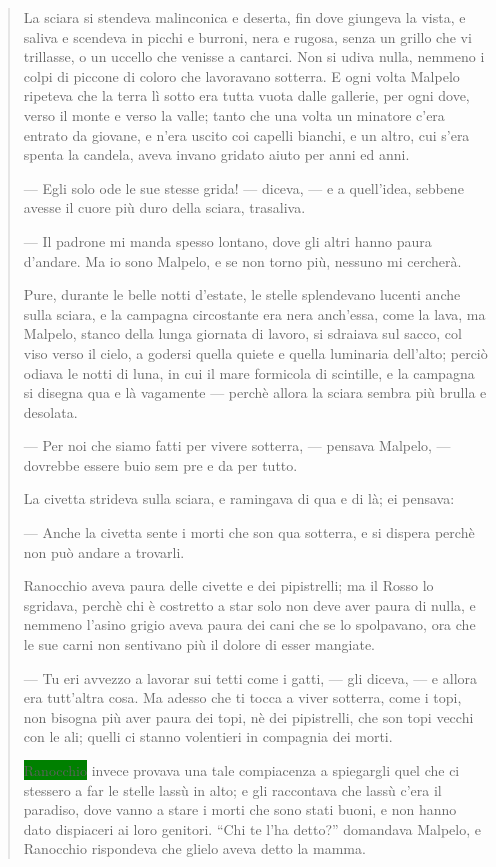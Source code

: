 \documentclass{book}
\newcounter{mar}
\begin{document}
\begin{quote}
 La sciara si stendeva malinconica e deserta, fin dove giungeva la vista, e saliva e scendeva in picchi e burroni, nera e rugosa, senza un grillo che vi trillasse, o un uccello che venisse a cantarci. Non si udiva nulla, nemmeno i colpi di piccone di coloro che lavoravano sotterra. E ogni volta Malpelo ripeteva che la terra lì sotto era tutta vuota dalle gallerie, per ogni dove, verso il monte e verso la valle; tanto che una volta un minatore c’era entrato da giovane, e n’era uscito coi capelli bianchi, e un altro, cui s’era spenta la candela, aveva invano gridato aiuto per anni ed anni.
 
 — Egli solo ode le sue stesse grida! — diceva, — e a quell’idea, sebbene avesse il cuore più duro della sciara, trasaliva.
 
 — Il padrone mi manda spesso lontano, dove gli altri hanno paura d’andare. Ma io sono Malpelo, e se non torno più, nessuno mi cercherà.
 
 Pure, durante le belle notti d’estate, le stelle splendevano lucenti anche sulla sciara, e la campagna circostante era nera anch’essa, come la lava, ma Malpelo, stanco della lunga giornata di lavoro, si sdraiava sul sacco, col viso verso il cielo, a godersi quella quiete e quella luminaria dell’alto; perciò odiava le notti di luna, in cui il mare formicola di scintille, e la campagna si disegna qua e là vagamente — perchè allora la sciara sembra più brulla e desolata.
 
 — Per noi che siamo fatti per vivere sotterra, — pensava Malpelo, — dovrebbe essere buio sem pre e da per tutto.
 
 La civetta strideva sulla sciara, e ramingava di qua e di là; ei pensava:
 
 — Anche la civetta sente i morti che son qua sotterra, e si dispera perchè non può andare a trovarli.
 
 Ranocchio aveva paura delle civette e dei pipistrelli; ma il Rosso lo sgridava, perchè chi è costretto a star solo non deve aver paura di nulla, e nemmeno l’asino grigio aveva paura dei cani che se lo spolpavano, ora che le sue carni non sentivano più il dolore di esser mangiate.
 
 — Tu eri avvezzo a lavorar sui tetti come i gatti, — gli diceva, — e allora era tutt’altra cosa. Ma adesso che ti tocca a viver sotterra, come i topi, non bisogna più aver paura dei topi, nè dei pipistrelli, che son topi vecchi con le ali; quelli ci stanno volentieri in compagnia dei morti.
 
 \colorbox{green}{Ranocchio} invece provava una tale compiacenza a spiegargli quel che ci stessero a far le stelle lassù in alto; e gli raccontava che lassù c’era il paradiso, dove vanno a stare i morti che sono stati buoni, e non hanno dato dispiaceri ai loro genitori. “Chi te l’ha detto?'' domandava Malpelo, e Ranocchio rispondeva che glielo aveva detto la mamma.
 

\end{quote}
\end{document}
